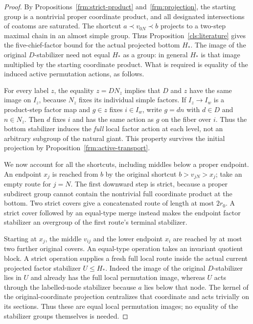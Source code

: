 \begin{proof}
By Propositions~\ref{frm:strict-product} and~\ref{frm:projection}, the
starting group is a nontrivial proper coordinate product, and all
designated intersections of coatoms are saturated.  The shortcut
$a\prec v_{0N}\prec b$ projects to a two-step maximal chain in an
almost simple group.  Thus Proposition~\ref{cls:literature} gives
the five-chief-factor bound for the actual projected bottom $H_*$.
The image of the original $D$-stabilizer need not equal $H_*$ as a
group: in general $H_*$ is that image multiplied by the starting
coordinate product.  What is required is equality of the induced
active permutation actions, as follows.

For every label $z$, the equality $z=DN_z$ implies that $D$ and $z$
have the same image on $I_z$, because $N_z$ fixes its individual
simple factors.  If $I_z\to I_w$ is a product-step factor map and
$g\in z$ fixes $i\in I_w$, write $g=dn$ with $d\in D$ and
$n\in N_z$.  Then $d$ fixes $i$ and has the same action as $g$ on
the fiber over $i$.  Thus the bottom stabilizer induces the
\emph{full} local factor action at each level, not an arbitrary
subgroup of the natural giant.  This property survives the initial
projection by Proposition~\ref{frm:active-transport}.

We now account for all the shortcuts, including middles below a
proper endpoint.  An endpoint $x_j$ is reached from $b$ by the
original shortcut $b>v_{jN}>x_j$; take an empty route for $j=N$.
The first downward step is strict, because a proper subdirect group
cannot contain the nontrivial full coordinate product at the bottom.
Two strict covers give a concatenated route of length at most
$2r_0$.  A strict cover followed by an equal-type merge instead
makes the endpoint factor stabilizer an overgroup of the first
route's terminal stabilizer.

Starting at $x_j$, the middle $v_{ij}$ and the lower endpoint $x_i$
are reached by at most two further original covers.  An equal-type
operation takes an invariant quotient block.  A strict operation
supplies a fresh full local route inside the actual current
projected factor stabilizer $U\leq H_*$.  Indeed the image of the
original $D$-stabilizer lies in $U$ and already has the full local
permutation image, whereas $U$ acts through the labelled-node
stabilizer because $a$ lies below that node.  The kernel of the
original-coordinate projection centralizes that coordinate and acts
trivially on its sections.  Thus these are equal local permutation
images; no equality of the stabilizer groups themselves is needed.


\end{proof}
